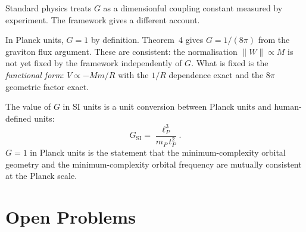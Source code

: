 \documentclass[11pt]{article}
\begin{document}
Standard physics treats $G$ as a dimensionful coupling constant
measured by experiment.
The framework gives a different account.

In Planck units, $G = 1$ by definition.
Theorem~4 gives $G = 1/(8\pi)$ from the graviton flux argument.
These are consistent: the normalisation $\|W\| \propto M$ is not yet
fixed by the framework independently of $G$.
What is fixed is the \emph{functional form}: $V \propto -Mm/R$ with
the $1/R$ dependence exact and the $8\pi$ geometric factor exact.

The value of $G$ in SI units is a unit conversion between Planck units
and human-defined units:
\[
  G_{\mathrm{SI}} = \frac{\ell_P^3}{m_P\,t_P^2}.
\]
$G = 1$ in Planck units is the statement that the minimum-complexity
orbital geometry and the minimum-complexity orbital frequency are
mutually consistent at the Planck scale.

\section{Open Problems}
\label{sec:open}
\end{document}
